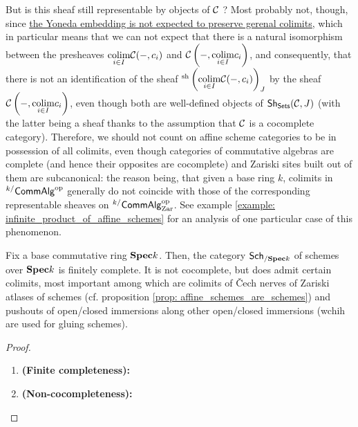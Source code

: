 \begin{remark}
                    But is this sheaf still representable by objects of $\mathcal{C}$ ? Most probably not, though, since \href{https://ncatlab.org/nlab/show/hom-functor+preserves+limits}{\underline{the Yoneda embedding is not expected to preserve gerenal colimits}}, which in particular means that we can not expect that there is a natural isomorphism between the presheaves $\underset{i \in I}{\operatorname{colim}} \mathcal{C}(-, c_i)$ and $\mathcal{C}\left(-, \underset{i \in I}{\operatorname{colim}} c_i\right)$, and consequently, that there is not an identification of the sheaf ${}^{\mathrm{sh}}\left(\underset{i \in I}{\operatorname{colim}} \mathcal{C}(-, c_i)\right)_J$ by the sheaf $\mathcal{C}\left(-, \underset{i \in I}{\operatorname{colim}} c_i\right)$, even though both are well-defined objects of $\mathsf{Sh}_{\mathsf{Sets}}(\mathcal{C}, J)$ (with the latter being a sheaf thanks to the assumption that $\mathcal{C}$ is a cocomplete category). Therefore, we should not count on affine scheme categories to be in possession of all colimits, even though categories of commutative algebras are complete (and hence their opposites are cocomplete) and Zariski sites built out of them are subcanonical: the reason being, that given a base ring $k$, colimits in ${}^{k/}\mathsf{Comm}\mathsf{Alg}^{\mathrm{op}}$ generally do not coincide with those of the corresponding representable sheaves on ${}^{k/}\mathsf{Comm}\mathsf{Alg}^{\mathrm{op}}_{\mathrm{Zar}}$. See example \ref{example: infinite_product_of_affine_schemes} for an analysis of one particular case of this phenomenon.
                \end{remark}
                \begin{example} \label{example: infinite_product_of_affine_schemes}
                    
                \end{example}
                        
                \begin{proposition} \label{limits_and_colimits_of_schemes}   
                    Fix a base commutative ring $\mathbf{Spec} k$. Then, the category $\mathsf{Sch}_{/\mathbf{Spec} k}$ of schemes over $\mathbf{Spec} k$ is finitely complete. It is not cocomplete, but does admit certain colimits, most important among which are colimits of \v{C}ech nerves of Zariski atlases of schemes (cf. proposition \ref{prop: affine_schemes_are_schemes}) and pushouts of open/closed immersions along other open/closed immersions (wchih are used for gluing schemes).
                \end{proposition}
                    \begin{proof}
                        \noindent
                        \begin{enumerate}
                            \item \textbf{(Finite completeness):}
                            \item \textbf{(Non-cocompleteness):}  
                        \end{enumerate}
                    \end{proof}
                    
